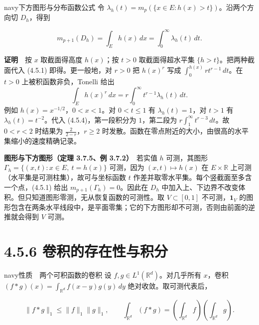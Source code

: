 \documentclass[11pt,a4paper]{article}
\begin{document}
\begin{sboxenv}{navy}{下方图形与分布函数公式}
令 \(\lambda_h(t)=m_p(\{x\in E:h(x)>t\})\)。沿两个方向切 \(D_h\)，得到

\begin{equation*}
m_{p+1}(D_h)=\int_E h(x)\,dx=\int_0^\infty\lambda_h(t)\,dt .
\tag{4.5.3}
\end{equation*}

\end{sboxenv}

\textbf{证明}　按 \(x\) 取截面得高度 \(h(x)\)；按 \(t>0\)
取截面得超水平集 \(\{h>t\}\)。把两种截面代入 (4.5.1) 即得。更一般地，对
\(r>0\) 把 \(h(x)^r\) 写成 \(\int_0^{h(x)}rt^{r-1}\,dt\)。在 \(t>0\)
上被积函数非负，Tonelli 给出 \begin{equation*}
\int_E h(x)^r\,dx
=r\int_0^\infty t^{r-1}\lambda_h(t)\,dt .
\tag{4.5.4}
\end{equation*} 例如 \(h(x)=x^{-1/2}\)，\(0<x<1\)。对 \(0<t\le1\) 有
\(\lambda_h(t)=1\)，对 \(t>1\) 有 \(\lambda_h(t)=t^{-2}\)。代入
(4.5.4)，第一段积分为 \(1\)，第二段为 \(r\int_1^\infty t^{r-3}\,dt\)。故
\(0<r<2\) 时结果为 \(\frac{2}{2-r}\)，\(r\ge2\)
时发散。函数在零点附近的大小，由很高的水平集缩小的速度精确记录。

\textbf{图形与下方图形（定理 3.7.5、例 3.7.2）}　若实值 \(h\)
可测，其图形 \(\Gamma_h=\{(x,t):x\in E,\ t=h(x)\}\) 可测，因为
\((x,t)\mapsto h(x)\) 在 \(E\times\mathbb R\)
上可测（水平集是可测柱集），故可与坐标函数 \(t\)
作差并取零水平集。每个竖截面至多含一个点，(4.5.1) 给出
\(m_{p+1}(\Gamma_h)=0\)。因此在 \(D_h\)
中加入上、下边界不改变体积。但只知道图形零测，无从恢复函数的可测性。取
\(V\subset[0,1]\) 不可测，\(\mathbf1_V\)
的图形包含在两条水平线段中，是平面零集；它的下方图形却不可测，否则由前面的逆推就会得到
\(V\) 可测。

\section[\S{}4.5.6
卷积的存在性与积分]{4.5.6
卷积的存在性与积分}\label{ux5377ux79efux7684ux5b58ux5728ux6027ux4e0eux79efux5206}

\begin{sboxenv}{navy}{性质　两个可积函数的卷积}
设 \(f,g\in L^1(\mathbb R^d)\)。对几乎所有 \(x\)，卷积
\((f*g)(x)=\int_{\mathbb R^d}f(x-y)g(y)\,dy\) 绝对收敛。取可测代表后，

\begin{equation*}
\|f*g\|_1\le\|f\|_1\|g\|_1,\qquad
\int_{\mathbb R^d}(f*g)=\left(\int_{\mathbb R^d}f\right)\left(\int_{\mathbb R^d}g\right).
\tag{4.5.5}
\end{equation*}

\end{sboxenv}
\end{document}
